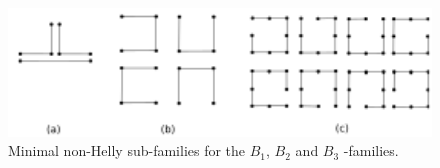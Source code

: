 \begin{figure}[!h]
\begin{center}
\includegraphics[width=12cm]{./img/b1epgSub.pdf}
\end{center}
\caption{Minimal non-Helly sub-families for the $B_1$, $B_2$ and $B_3$ -families.}
\end{figure}

